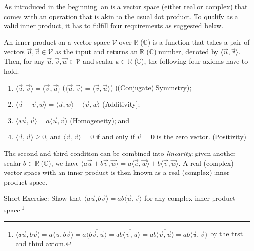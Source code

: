 As introduced in the beginning, an  is a vector space (either real or complex) that comes with an  operation that is akin to the usual dot product. To qualify as a valid inner product, it has to fulfill four requirements as suggested below.
\begin{defn}
\label{defn:innerprod}
An inner product on a vector space $\mathcal{V}$ over $\mathbb{R}$ ($\mathbb{C}$) is a function that takes a pair of vectors $\vec{u}, \vec{v} \in \mathcal{V}$ as the input and returns an $\mathbb{R}$ ($\mathbb{C}$) number, denoted by $\langle \vec{u}, \vec{v} \rangle$. Then, for any $\vec{u}, \vec{v}, \vec{w} \in \mathcal{V}$ and scalar $a \in \mathbb{R}$ ($\mathbb{C}$), the following four axioms have to hold.
\begin{enumerate}
    \item $\langle \vec{u}, \vec{v} \rangle = \langle \vec{v}, \vec{u} \rangle$ ($\langle \vec{u}, \vec{v} \rangle = \overline{\langle \vec{v}, \vec{u} \rangle}$) ((Conjugate) Symmetry);
    \item $\langle \vec{u}+\vec{v}, \vec{w} \rangle = \langle \vec{u}, \vec{w} \rangle + \langle \vec{v}, \vec{w} \rangle$ (Additivity);
    \item $\langle a\vec{u}, \vec{v} \rangle = a\langle \vec{u}, \vec{v} \rangle$ (Homogeneity); and
    \item $\langle \vec{v}, \vec{v} \rangle \geq 0$, and $\langle \vec{v}, \vec{v} \rangle = 0$ if and only if $\vec{v} = \textbf{0}$ is the zero vector. (Positivity)
\end{enumerate}
The second and third condition can be combined into \textit{linearity}: given another scalar $b \in \mathbb{R}$ ($\mathbb{C}$), we have $\langle a\vec{u}+b\vec{v}, \vec{w} \rangle = a\langle \vec{u}, \vec{w} \rangle + b\langle \vec{v}, \vec{w} \rangle$. A real (complex) vector space with an inner product is then known as a real (complex) inner product space. 
\end{defn}
Short Exercise: Show that $\langle a\vec{u}, b\vec{v} \rangle = a\bar{b}\langle \vec{u}, \vec{v} \rangle$ for any complex inner product space.\footnote{$\langle a\vec{u}, b\vec{v} \rangle = a\langle \vec{u}, b\vec{v} \rangle = a\overline{\langle b\vec{v}, \vec{u} \rangle} = a\overline{b\langle \vec{v}, \vec{u} \rangle} = a\bar{b} \overline{\langle \vec{v}, \vec{u} \rangle} = a\bar{b}\langle \vec{u}, \vec{v} \rangle$ by the first and third axiom.}\par
